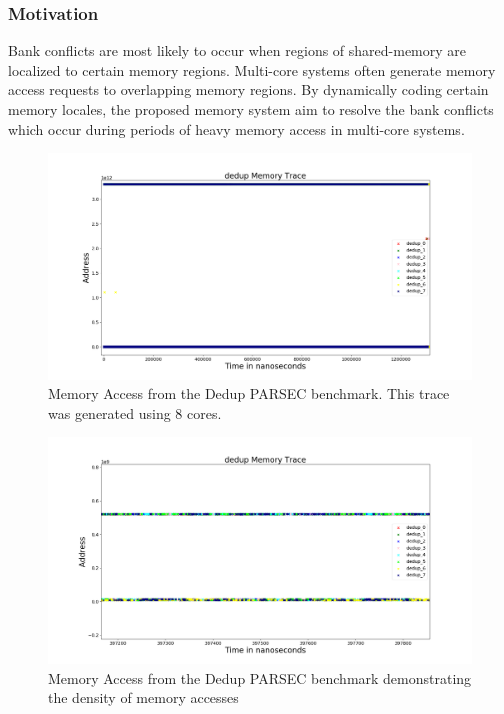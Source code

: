\subsubsection{Motivation}
Bank conflicts are most likely to occur when regions of shared-memory are localized to certain memory regions. Multi-core systems often generate memory access requests to overlapping memory regions. By dynamically coding certain memory locales, the proposed memory system aim to resolve the bank conflicts which occur during periods of heavy memory access in multi-core systems.

\begin{figure}[htbp]
		\includegraphics[width=\linewidth]{fig/dedup_whole.png}
		\caption{Memory Access from the Dedup PARSEC benchmark. This trace was generated using 8 cores.}
		\label{fig:dedup_whole}
\end{figure}

\begin{figure}[htbp]
		\includegraphics[width=\linewidth]{fig/dedup_dense.png}
		\caption{Memory Access from the Dedup PARSEC benchmark demonstrating the density of memory accesses}
		\label{fig:dedup_dense}
\end{figure}

